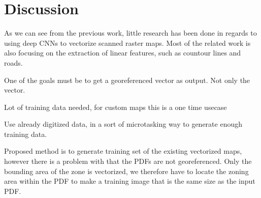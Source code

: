 \chapter{Discussion}
As we can see from the previous work, little research has been done in regards to using deep CNNs to vectorize scanned raster maps. Most of the related work is also focusing on the extraction of linear features, such as countour lines and roads. 

One of the goals must be to get a georeferenced vector as output. Not only the vector. 

Lot of training data needed, for custom maps this is a one time usecase

Use already digitized data, in a sort of microtasking way to generate enough training data.

Proposed method is to generate training set of the existing vectorized maps, however there is a problem with that the PDFs are not georeferenced. Only the bounding area of the zone is vectorized, we therefore have to locate the zoning area within the PDF to make a training image that is the same size as the input PDF.